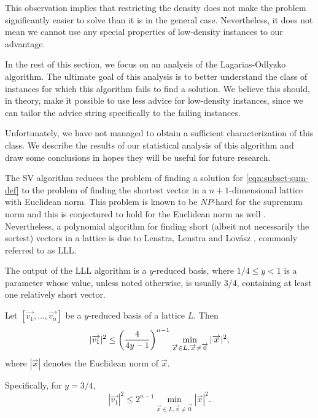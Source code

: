 This observation implies that restricting the density does not make the
problem significantly easier to solve than it is in the general case.
Nevertheless, it does not mean we cannot use any special properties of
low-density instances to our advantage.

In the rest of this section, we focus on an analysis of the
Lagarias-Odlyzko algorithm. The ultimate goal of this analysis is to
better understand the class of instances for which this algorithm fails to
find a solution. We believe this should, in theory, make it possible to
use less advice for low-density instances, since we can tailor the advice
string specifically to the failing instances.

Unfortunately, we have not managed to obtain a sufficient characterization
of this class. We describe the results of our statistical analysis of this
algorithm and draw some conclusions in hopes they will be useful for
future research.

The SV algorithm reduces the problem of finding a solution for
\eqref{eqn:subset-sum-def} to the problem of finding the shortest vector
in a $n+1$-dimensional lattice with Euclidean norm. This problem is known
to be $NP$-hard for the supremum norm and this is conjectured to hold for
the Euclidean norm as well \cite{van-emde-boas-shortest-vector}.
Nevertheless, a polynomial algorithm for finding short (albeit not
necessarily the sortest) vectors in a lattice is due to Lenstra, Lenstra
and Lovász \cite{LLL}, commonly referred to as LLL.

The output of the LLL algorithm is a $y$-reduced basis, where $1/4 \leq y
< 1$ is a parameter whose value, unless noted otherwise, is usually $3/4$,
containing at least one relatively short vector.

\begin{theorem}\label{theorem:LLL-short-vector}
    Let $[\vec{v_1}, \dots, \vec{v_n}]$ be a $y$-reduced basis of a
    lattice $L$. Then
    \begin{equation}\label{eqn:lll-y-reduced}
        |\vec{v_1}|^2 \leq \paren*{\frac{4}{4y-1}}^{n-1}
        \min\limits_{\vec{x} \in L, \vec{x} \not= \vec{0}} |\vec{x}|^2,
    \end{equation}
    where $|\vec{x}|$ denotes the Euclidean norm of $\vec{x}$.

    Specifically, for $y = 3/4$,
    \begin{equation}\label{eqn:lll-3/4-reduced}
        |\vec{v_1}|^2 \leq 2^{n-1} \min\limits_{\vec{x} \in L, \vec{x}
        \not= \vec{0}} |\vec{x}|^2.
    \end{equation}
\end{theorem}

